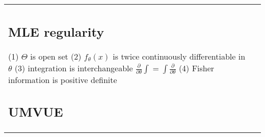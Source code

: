 \begin{tabulary}{\textwidth}{l || L}
	\subsection{MLE regularity}

	(1) $\Theta$ is open set
	(2) $f_\theta(x)$ is twice continuously differentiable in $\theta$
	(3) integration is interchangeable $\frac{\partial}{\partial\theta}\int = \int \frac{\partial}{\partial\theta}$
	(4) Fisher information is positive definite



	\subsection{UMVUE}


\end{tabulary}
